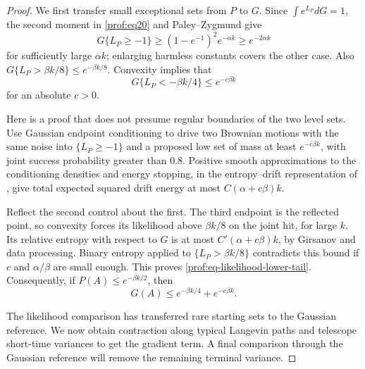 \begin{proof}
We first transfer small exceptional sets from \(P\) to \(G\).  Since
\(\int e^{L_P}dG=1\), the second moment in \eqref{prof:eq20} and
Paley--Zygmund give
\[
 G\{L_P\ge-1\}\ge(1-e^{-1})^2e^{-\alpha k}
                       \ge e^{-2\alpha k}
\]
for sufficiently large \(\alpha k\); enlarging harmless constants covers
the other case.  Also
\(G\{L_P>\beta k/8\}\le e^{-\beta k/8}\).
Convexity implies that
\begin{equation}
 G\{L_P<-\beta k/4\}\le e^{-c\beta k}
 \label{prof:eq-likelihood-lower-tail}
\end{equation}
for an absolute \(c>0\).

Here is a proof that does not presume regular
boundaries of the two level sets.  Use Gaussian endpoint conditioning to
drive two Brownian motions with the same noise into
\(\{L_P\ge-1\}\) and a proposed low set of mass at least
\(e^{-c\beta k}\), with joint success probability greater than \(0.8\).
Positive smooth approximations to the conditioning densities and energy
stopping, in the entropy--drift representation of
\citet[Proposition~1 and Section~2.5]{Lehec2013Entropy}, give total
expected squared drift energy at most
\(C(\alpha+c\beta)k\).

Reflect the second control about the first.
The third endpoint is the reflected point, so convexity forces its
likelihood above \(\beta k/8\) on the joint hit, for large \(k\).
Its relative entropy with respect to \(G\) is at most
\(C'(\alpha+c\beta)k\), by Girsanov and data processing.  Binary entropy
applied to \(\{L_P>\beta k/8\}\) contradicts this bound if \(c\) and
\(\alpha/\beta\) are small enough.  This proves
\eqref{prof:eq-likelihood-lower-tail}.  Consequently, if
\(P(A)\le e^{-\beta k/2}\), then
\[
 G(A)\le e^{-\beta k/4}+e^{-c\beta k}.
\]

The likelihood comparison has transferred rare starting sets to the
Gaussian reference. We now obtain contraction along typical Langevin
paths and telescope short-time variances to get the gradient term.
A final comparison through the Gaussian reference will remove the
remaining terminal variance.


\end{proof}
